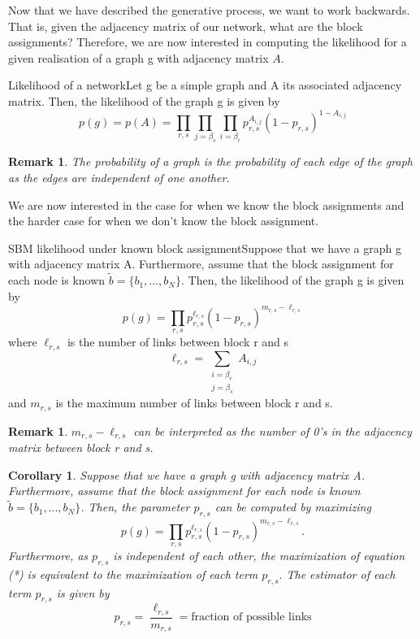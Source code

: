 \documentclass[twoside]{article}
\newtheorem{corollary}[theorem]{Corollary}
\newtheorem{remark}[theorem]{Remark}
\begin{document}
Now that we have described the generative process, we want to work backwards. That is, given the adjacency matrix of our network, what are the block assignments? Therefore, we are now interested in computing the likelihood for a given realisation of a graph g with adjacency matrix $A.$

\begin{definition_exam}{Likelihood of a network}{}Let g be a simple graph and A its associated adjacency matrix. Then, the likelihood of the graph g is given by 
$$
p(g) = p(A) = \prod_{r,s}\prod_{j = \beta_{s}}\prod_{i = \beta_{r}}p_{r,s}^{A_{i,j}}(1 - p_{r,s})^{1 - A_{i,j}}
$$
\end{definition_exam}

\begin{remark}The probability of a graph is the probability of each edge of the graph as the edges are independent of one another.
\end{remark}

We are now interested in the case for when we know the block assignments and the harder case for when we don't know the block assignment.

\begin{proposition_exam}{SBM likelihood under known block assignment}{}Suppose that we have a graph g with adjacency matrix A. Furthermore, assume that the block assignment for each node is known $\tilde{b} = \{b_1,...,b_N\}$. Then, the likelihood of the graph g is given by 
$$
p(g) = \prod_{r,s}p_{r,s}^{\ell_{r,s}}(1 - p_{r,s})^{m_{r,s} - \ell_{r,s}}
$$
where $\ell_{r,s}$ is the number of links between block r and s 
$$
\ell_{r,s} = \sum_{\substack{i = \beta_r \\ j = \beta_s}}A_{i,j}
$$
and $m_{r,s}$ is the maximum number of links between block r and s.
\end{proposition_exam}

\begin{remark}$m_{r,s} - \ell_{r,s}$ can be interpreted as the number of 0's in the adjacency matrix between block r and s.
\end{remark}

\begin{corollary}Suppose that we have a graph g with adjacency matrix A. Furthermore, assume that the block assignment for each node is known $\tilde{b} = \{b_1,...,b_N\}$. Then, the parameter $p_{r,s}$ can be computed by maximizing 
\begin{equation}
p(g) = \prod_{r,s}p_{r,s}^{\ell_{r,s}}(1 - p_{r,s})^{m_{r,s} - \ell_{r,s}}.
\tag{*}
\end{equation}
Furthermore, as $p_{r,s}$ is independent of each other, the maximization of equation (*) is equivalent to the maximization of each term $p_{r,s}.$ The estimator of each term $p_{r,s}$ is given by 
$$
\hat{p_{r,s}} = \frac{\ell_{r,s}}{m_{r,s}} = \text{fraction of possible links}
$$
\end{corollary}
\end{document}
